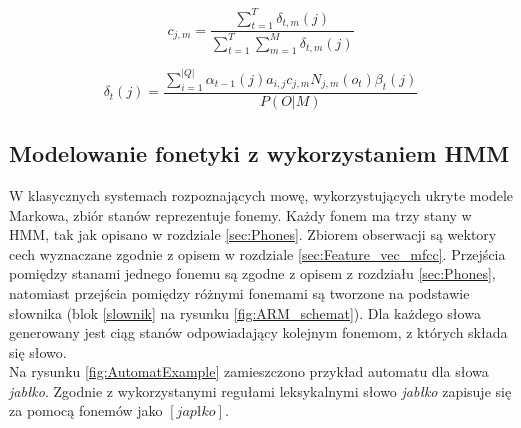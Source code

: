 \documentclass[shortabstract, mgr]{iithesis}
\newcommand{\refBlock}[1]{
	\hyperref[#1]{\ref*{#1}}
}
\begin{document}
	   \begin{equation}
	   c_{j,m}=\frac{\sum_{t=1}^T\delta_{t,m}(j)}{\sum_{t=1}^T\sum_{m=1}^M\delta_{t,m}(j)}
	   \label{eqn:b_c_c}
	   \end{equation}
	   
	   \begin{equation}
	   \delta_t(j)= \frac{\sum_{i=1}^{|Q|}\alpha_{t-1}(j)a_{i,j}c_{j,m}N_{j,m}(o_{t})\beta_{t}(j)}{P(O|M)}
	   \label{eqn:delta}
	   \end{equation}
	   
    \subsection{Modelowanie fonetyki z wykorzystaniem HMM }
    \label{sec:hmm_in_asr}
    W klasycznych systemach rozpoznających mowę, wykorzystujących ukryte modele Markowa, zbiór stanów reprezentuje fonemy. Każdy fonem ma trzy stany w HMM, tak jak opisano w rozdziale \ref{sec:Phones}. Zbiorem obserwacji są wektory cech wyznaczane zgodnie z opisem w rozdziale \ref{sec:Feature_vec_mfcc}. Przejścia pomiędzy stanami jednego fonemu są zgodne z opisem z rozdziału \ref{sec:Phones}, natomiast przejścia pomiędzy różnymi fonemami są tworzone na podstawie słownika (blok \refBlock{slownik} na rysunku \ref{fig:ARM_schemat}). Dla każdego słowa generowany jest ciąg stanów odpowiadający kolejnym fonemom, z których składa się słowo. \\
    Na rysunku \ref{fig:AutomatExample} zamieszczono przykład automatu dla słowa \textit{jabłko}. Zgodnie z wykorzystanymi regułami leksykalnymi słowo \textit{jabłko} zapisuje się za pomocą fonemów jako $[j a p ł k o]$. \\
    
\end{document}
